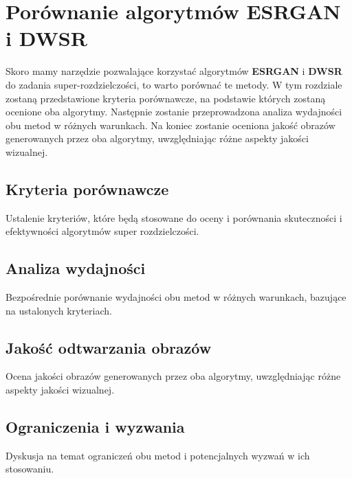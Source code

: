 \chapter{Porównanie algorytmów ESRGAN i DWSR} \label{chap:porownanie_algorytmow}

Skoro mamy narzędzie pozwalające korzystać algorytmów \textbf{ESRGAN} i \textbf{DWSR} do zadania super-rozdzielczości, to warto porównać te metody. W tym rozdziale zostaną przedstawione kryteria porównawcze, na podstawie których zostaną ocenione oba algorytmy. Następnie zostanie przeprowadzona analiza wydajności obu metod w różnych warunkach. Na koniec zostanie oceniona jakość obrazów generowanych przez oba algorytmy, uwzględniając różne aspekty jakości wizualnej.


\section{Kryteria porównawcze}


Ustalenie kryteriów, które będą stosowane do oceny i porównania skuteczności i efektywności algorytmów super rozdzielczości.


\cite{wang2018esrgan}


\section{Analiza wydajności}


Bezpośrednie porównanie wydajności obu metod w różnych warunkach, bazujące na ustalonych kryteriach.



\section{Jakość odtwarzania obrazów}


Ocena jakości obrazów generowanych przez oba algorytmy, uwzględniając różne aspekty jakości wizualnej.



\section{Ograniczenia i wyzwania}


Dyskusja na temat ograniczeń obu metod i potencjalnych wyzwań w ich stosowaniu.